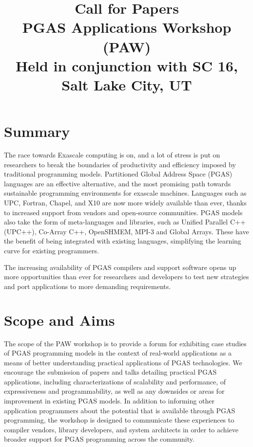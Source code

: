 \documentclass[12pt]{article}
\title{Call for Papers \\
PGAS Applications Workshop (PAW) \\
Held in conjunction with SC 16, Salt Lake City, UT}
\date{}
\begin{document}
\maketitle


\section{Summary}

The race towards Exascale computing is on, and a lot of stress is put
on researchers to break the boundaries of productivity and efficiency
imposed by traditional programming models. 
Partitioned Global Address Space (PGAS) languages are  an
effective alternative, and the most promising path towards 
sustainable programming environments for exascale machines. 
Languages such as UPC, Fortran, Chapel, and X10 are now more widely
available than ever, thanks to increased support from vendors and
open-source communities. PGAS models also take the form of meta-languages 
and libraries, such as Unified Parallel C++ (UPC++), Co-Array C++, 
OpenSHMEM, MPI-3 and Global Arrays.
These have the benefit of being integrated with existing languages, 
simplifying the learning curve for existing programmers.

The increasing availability of PGAS compilers and support software
opens up more opportunities than ever for researchers and developers
to test new strategies and port applications to more demanding
requirements. 

\section{Scope and Aims}

The scope of the PAW workshop is to provide a forum for exhibiting case studies of PGAS 
programming models in the context of real-world applications as a means of better 
understanding practical applications of PGAS technologies.  We encourage the submission 
of papers and talks detailing practical PGAS applications, including characterizations of 
scalability and performance, of expressiveness and programmability, as well as any downsides 
or areas for improvement in existing PGAS models. In addition to informing other application 
programmers about the potential that is available through PGAS programming, the workshop is 
designed to communicate these experiences to compiler vendors, library developers, and system 
architects in order to achieve broader support for PGAS programming across the community.
\end{document}

